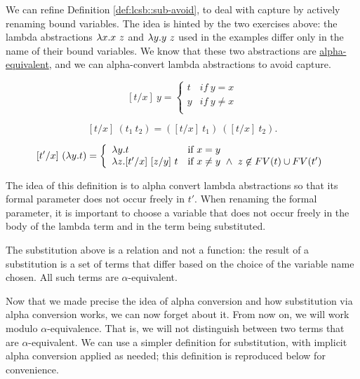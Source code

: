 We can refine
%
Definition \ref{def:lcsb::sub-avoid},
%
to deal with capture by actively renaming bound variables.
%
The idea is hinted by the two exercises above:  the lambda
abstractions $\lambda x.x~z$ and $\lambda y.y~z$ used in the examples differ only in the name of their bound variables.  
%
We know that these two abstractions are 
%
\href{def:lcs::alpha}{alpha-equivalent}, and
%
we can alpha-convert lambda abstractions to avoid capture.  

\begin{flex}
\begin{definition}
\label{def:lcsb::sub-exp}
\[
[t/x]~y = \left\{ \begin{array}{ll}
        t & if~y = x \\
        y & if~y\neq x \\
        \end{array} \right.
\]


\[
[t/x]~(t_1~t_2) = \left([t/x]~t_1\right)~\left([t/x]~t_2\right).
 \]



\[
[t'/x]~(\lambda y.t)  =
\left\{ \begin{array}{ll}
        \lambda y.t&\mbox{if}~x = y \\
        \lambda z. [t'/x]~[z/y]~t
        &\mbox{if}~ x \not= y ~ \land ~ z \not\in FV(t) \cup FV(t') \\
       \end{array} \right. \]
\end{definition}

\begin{remark}
The idea of this definition is to alpha convert lambda
abstractions so that its formal parameter does not occur freely in $t'$.
%
When renaming the formal parameter, it is important to choose a variable that does not occur freely in the body of the lambda term and in the term being substituted.
\end{remark}

\begin{note}
The substitution above is a relation and not a function: the result of
a substitution is a set of terms that differ based on the choice of
the variable name chosen.  All such terms are $\alpha$-equivalent.
\end{note}
\end{flex}

\begin{gram}
Now that we made precise the idea of alpha conversion and how
substitution via alpha conversion works, we can now forget about it.
%
From now on, we will work modulo $\alpha$-equivalence.  That is, we
will not distinguish between two terms that are $\alpha$-equivalent.
%
We can  use a simpler  definition for substitution, with implicit alpha conversion applied as needed; this definition is reproduced below for convenience.
\end{gram}


